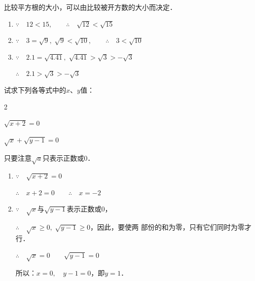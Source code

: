 \begin{solution}
    比较平方根的大小，可以由比较被开方数的大小而决定．
\begin{enumerate}
    \item $\because\quad 12<15,\qquad \therefore\quad \sqrt{12}<\sqrt{15}$
    \item  $\because\quad 3=\sqrt{9},\; \sqrt{9}<\sqrt{10},\qquad \therefore\quad 3<\sqrt{10}$
    \item  $\because\quad 2.1=\sqrt{4.41},\;\sqrt{4.41}>\sqrt{3}>-\sqrt{3}$
    
    $\therefore\quad 2.1>\sqrt{3}>-\sqrt{3}$
\end{enumerate}

\end{solution}




\begin{example}
    试求下列各等式中的$x$、$y$值：
    \begin{enumerate}
        \begin{multicols}{2}
               \item $\sqrt{x+2}=0$
        \item $\sqrt{x}+\sqrt{y-1}=0$
        \end{multicols}
    \end{enumerate}
\end{example}


\begin{solution}
只要注意$\sqrt{a}$只表示正数或0．
\begin{enumerate}
    \item $\because\quad \sqrt{x+2}=0$
    
    $\therefore\quad x+2=0\qquad \therefore\quad x=-2$  
    \item $\because\quad \sqrt{x}$与$\sqrt{y-1}$表示正数或0，
    
    $\therefore\quad \sqrt{x}\ge 0, \; \sqrt{y-1}\ge 0$，因此，要使两
    部份的和为零，只有它们同时为零才行．

    $\therefore\quad\sqrt{x}=0\qquad \sqrt{y-1}=0$

    所以：$x=0,\quad y-1=0$，即$y=1$．
\end{enumerate}
\end{solution}

